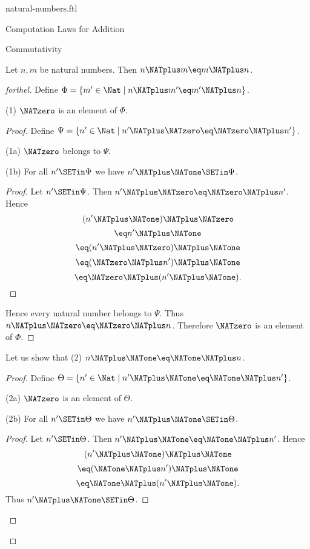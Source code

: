 \documentclass{naproche-library}
\begin{document}
\begin{smodule}[title=Natural Numbers]{natural-numbers.ftl}
\begin{sfragment}{Computation Laws for Addition}
  \begin{sfragment}{Commutativity}
    \begin{proposition}[forthel,id=ARITHMETIC_03_4029553232052224]
      Let $n, m$ be natural numbers.
      Then $n \NATplus m \eq m \NATplus n$.
    \end{proposition}
    \begin{proof}[forthel]
      Define $\Phi = \{ m' \in \Nat \mid n \NATplus m' \eq m' \NATplus n \}$.

      (1) $\NATzero$ is an element of $\Phi$.
      \begin{proof}
        Define $\Psi = \{ n' \in \Nat \mid n' \NATplus \NATzero \eq \NATzero \NATplus n' \}$.

        (1a) $\NATzero$ belongs to $\Psi$.

        (1b) For all $n' \SETin \Psi$ we have $n' \NATplus \NATone \SETin \Psi$.
        \begin{proof}
          Let $n' \SETin \Psi$.
          Then $n' \NATplus \NATzero \eq \NATzero \NATplus n'$.
          Hence
          \[  (n' \NATplus \NATone) \NATplus \NATzero        \]
          \[    \eq n' \NATplus \NATone          \]
          \[    \eq (n' \NATplus \NATzero) \NATplus \NATone    \]
          \[    \eq (\NATzero \NATplus n') \NATplus \NATone    \]
          \[    \eq \NATzero \NATplus (n' \NATplus \NATone).   \]
        \end{proof}

        Hence every natural number belongs to $\Psi$.
        Thus $n \NATplus \NATzero \eq \NATzero \NATplus n$.
        Therefore $\NATzero$ is an element of $\Phi$.
      \end{proof}

      Let us show that (2) $n \NATplus \NATone \eq \NATone \NATplus n$.
      \begin{proof}
        Define $\Theta = \{ n' \in \Nat \mid n' \NATplus \NATone \eq \NATone \NATplus n' \}$.

        (2a) $\NATzero$ is an element of $\Theta$.

        (2b) For all $n' \SETin \Theta$ we have $n' \NATplus \NATone \SETin \Theta$.
        \begin{proof}
          Let $n' \SETin \Theta$.
          Then $n' \NATplus \NATone \eq \NATone \NATplus n'$.
          Hence
          \[  (n' \NATplus \NATone) \NATplus \NATone        \]
          \[    \eq (\NATone \NATplus n') \NATplus \NATone    \]
          \[    \eq \NATone \NATplus (n' \NATplus \NATone).   \]
          Thus $n' \NATplus \NATone \SETin \Theta$.
        \end{proof}


\end{proof}
\end{proof}
\end{sfragment}
\end{sfragment}
\end{smodule}
\end{document}
